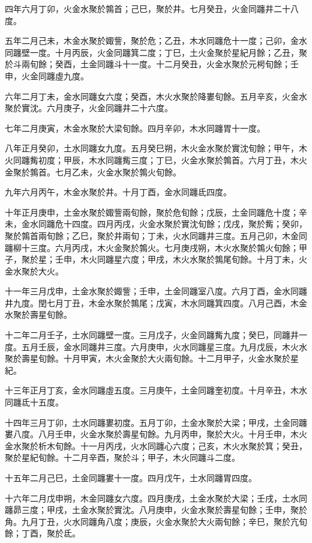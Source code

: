 \begin{pinyinscope}
四年六月丁卯，火金水聚於鶉首；己巳，聚於井。七月癸丑，火金同躔井二十八度。

五年二月己未，木金水聚於娵訾，聚於危；乙丑，木水同躔危十一度；己卯，金水同躔壁一度。十月丙辰，火金同躔箕二度；丁巳，土火金聚於星紀月餘；乙丑，聚於斗兩旬餘；癸酉，土金同躔斗十一度。十二月癸丑，火金水聚於元枵旬餘；壬申，火金同躔虛九度。

六年二月丁未，金水同躔女六度；癸酉，木火水聚於降婁旬餘。五月辛亥，火金水聚於實沈。六月庚子，火金同躔井二十六度。

七年二月庚寅，木金水聚於大梁旬餘。四月辛卯，木水同躔胃十一度。

八年正月癸卯，土水同躔女九度。五月癸巳朔，木火金水聚於實沈旬餘；甲午，木火同躔觜初度；甲辰，木水同躔觜三度；丁巳，火金水聚於鶉首。六月丁丑，木火金聚於鶉首。七月乙未，火金水聚於鶉火旬餘。

九年六月丙午，木金水聚於井。十月丁酉，金水同躔氐四度。

十年正月庚申，土金水聚於娵訾兩旬餘，聚於危旬餘；戊辰，土金同躔危十度；辛未，金水同躔危十四度。四月丙戌，火金水聚於實沈旬餘；戊戌，聚於觜；癸卯，聚於鶉首兩旬餘；乙巳，聚於井兩旬；丁未，火水同躔井三度。五月己卯，木金同躔柳十三度。六月丙戌，木火金聚於鶉火。七月庚戌朔，木火水聚於鶉火旬餘；甲子，聚於星；壬申，木火同躔星六度；甲戌，木火水聚於鶉尾旬餘。十月丁未，火金水聚於大火。

十一年三月戊申，土金水聚於娵訾；壬申，土金同躔室八度。六月丁酉，金水同躔井九度。閏七月丁丑，木金水聚於鶉尾；戊寅，木水同躔箕四度。八月己酉，木金水聚於壽星旬餘。

十二年二月壬子，土水同躔壁一度。三月戊子，火金同躔觜九度；癸巳，同躔井一度。五月壬辰，金水同躔井三度。六月庚申，火水同躔星三度。九月戊辰，木火水聚於壽星旬餘。十月甲寅，木火金聚於大火兩旬餘。十二月甲子，火金水聚於星紀。

十三年正月丁亥，金水同躔虛五度。三月庚午，土金同躔奎初度。十月辛丑，木水同躔氐十五度。

十四年三月丁卯，土水同躔婁初度。五月丁卯，土金水聚於大梁；甲戌，土金同躔婁八度。八月壬申，火金水聚於壽星旬餘。九月丙申，聚於大火。十月壬申，木火金水聚於析木旬餘。十一月丙戌，火水同躔心六度；己亥，木火水聚於箕；癸丑，聚於星紀旬餘。十二月辛酉，聚於斗；甲子，木火同躔斗二度。

十五年二月己巳，土金同躔婁十一度。四月戊午，土水同躔胃四度。

十六年二月戊申朔，木金同躔女六度。四月庚戌，土金水聚於大梁；壬戌，土水同躔昴三度；甲戌，土金水聚於實沈。八月庚申，火金水聚於壽星旬餘；壬申，聚於角。九月丁丑，火水同躔角八度；庚辰，火金水聚於大火兩旬餘；辛巳，聚於亢旬餘；丁酉，聚於氐。


\end{pinyinscope}
